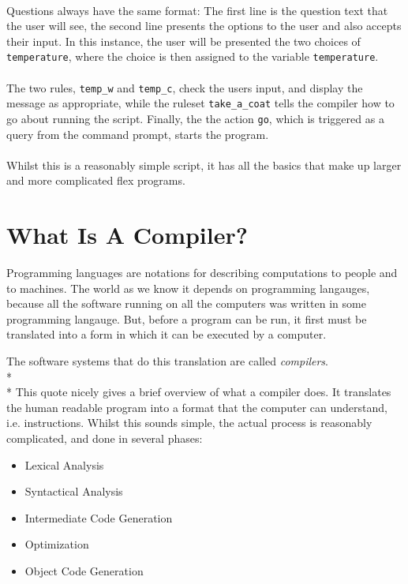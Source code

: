\documentclass[12pt]{report}
\begin{document}
\\
Questions always have the same format: The first line is the question text that the user will see, the second line presents the options to the user and also accepts their input.  In this instance, the user will be presented the two choices of \texttt{temperature}, where the choice is then assigned to the variable \texttt{temperature}.\\
\\
The two rules, \texttt{temp\_w} and \texttt{temp\_c}, check the users input, and display the message as appropriate, while the ruleset \texttt{take\_a\_coat} tells the compiler how to go about running the script.  Finally, the the action \texttt{go}, which is triggered as a query from the command prompt, starts the program.\\
\\
Whilst this is a reasonably simple script, it has all the basics that make up larger and more complicated flex programs.

\section{What Is A Compiler?}\label{sec:what_is_a_compiler}
Programming languages are notations for describing computations to people and to machines.  The world as we know it depends on programming langauges, because all the software running on all the computers was written in some programming langauge.  But, before a program can be run, it first must be translated into a form in which it can be executed by a computer.

The software systems that do this translation are called \textit{compilers}.\citep{compilers07}
\\*
\\*
This quote nicely gives a brief overview of what a compiler does.  It translates the human readable program into a format that the computer can understand, i.e. instructions.  Whilst this sounds simple, the actual process is reasonably complicated, and done in several phases:\\
\begin{itemize}
	\item Lexical Analysis
	\item Syntactical Analysis
	\item Intermediate Code Generation
	\item Optimization
	\item Object Code Generation
\end{itemize}\citep{compilerconstruction92}
\end{document}
